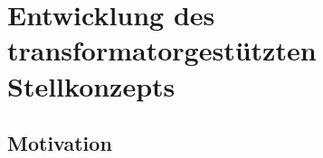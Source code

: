 \section{Entwicklung des transformatorgestützten Stellkonzepts}
\label{chap:entwicklung_stellkonzept}

\subsection{Motivation}
\label{sec:motivation}